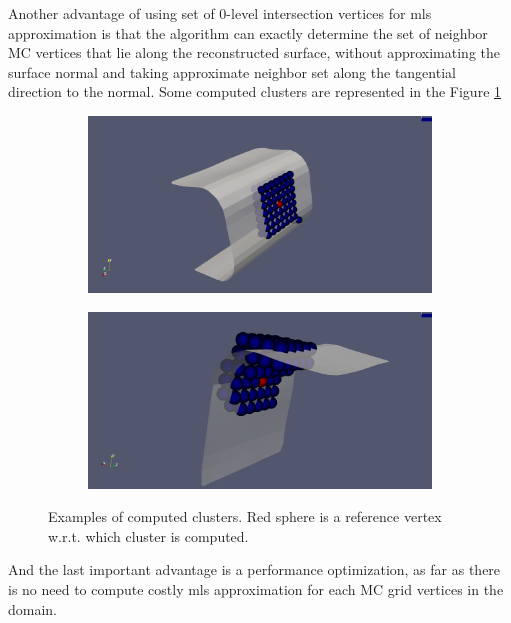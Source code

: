 Another advantage of using set of 0-level intersection vertices for mls approximation is that the algorithm can exactly determine the set of neighbor MC vertices that lie along the reconstructed surface, without approximating the surface normal and taking approximate neighbor set along the tangential direction to the normal. Some computed clusters are represented in the Figure \ref{fig:clusters}\\
\begin{figure}[H]
	\begin{center}
		\begin{subfigure}[b]{0.45\textwidth}
			\includegraphics[width=\textwidth]{figures/MlsCluster.png}
		\end{subfigure}
		\begin{subfigure}[b]{0.45\textwidth}
			\includegraphics[width=\textwidth]{figures/MlsCluster2.png}
		\end{subfigure}
	\end{center}
	\caption{Examples of computed clusters. Red sphere is a reference vertex w.r.t. which cluster is computed.}
	\label{fig:clusters}
\end{figure}

And the last important advantage is a performance optimization, as far as there is no need to compute costly mls approximation for each MC grid vertices in the domain.\\

